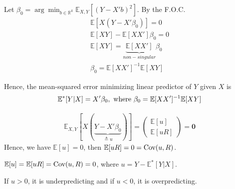 \documentclass[11pt]{elegantbook}
\begin{document}
Let $\beta_0=\arg\min_{b\in \mathbb{R}^k}\mathbb{E}_{X,Y}[(Y-X'b)^2]$. By the F.O.C.
\begin{equation}
    \begin{aligned}
        \mathbb{E}[X(Y-X'\beta_0)]=0\\
        \mathbb{E}[XY]-\mathbb{E}[XX']\beta_0=0\\
        \mathbb{E}[XY]=\underbrace{\mathbb{E}[XX']}_{non-singular}\beta_0\\
        \beta_0=\mathbb{E}[XX']^{-1}\mathbb{E}[XY]
    \end{aligned}
    \nonumber
\end{equation}
\begin{proposition}
    Hence, the mean-squared error minimizing linear predictor of $Y$ given $X$ is
    \begin{equation}
        \begin{aligned}
            \mathbb{E}^*[Y|X]=X'\beta_0, \textnormal{ where }\beta_0=\mathbb{E}[XX']^{-1}\mathbb{E}[XY]
        \end{aligned}
        \nonumber
    \end{equation}
\end{proposition}
\begin{equation}
    \begin{aligned}
        \mathbb{E}_{X,Y}[X(\underbrace{Y-X'\beta_0}_{\triangleq u})]=\begin{pmatrix}
            \mathbb{E}[u]\\
            \mathbb{E}[uR]
        \end{pmatrix}=\boldsymbol{0}
    \end{aligned}
    \nonumber
\end{equation}
Hence, we have $\mathbb{E}[u]=0$, then $\mathbb{E}[uR]=0=\textnormal{Cov}(u,R)$.
\begin{lemma}
    $\mathbb{E}[u]=\mathbb{E}[uR]=\textnormal{Cov}(u,R)=0$, where $u=Y-\mathbb{E}^*[Y|X]$.
\end{lemma}
If $u>0$, it is underpredicting and if $u<0$, it is overpredicting.
\end{document}
